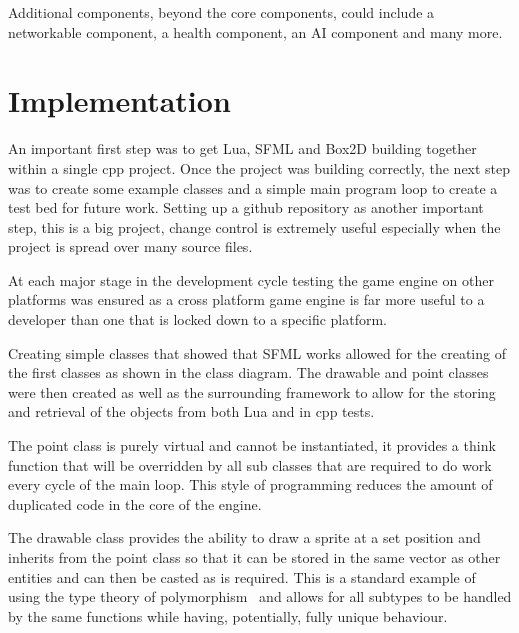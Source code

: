 \documentclass[11pt,a4paper,titlepage]{report}
\begin{document}
	Additional components, beyond the core components, could include a networkable component, a health component, an AI component and many more.










\chapter{Implementation}


    
    An important first step was to get Lua, SFML and Box2D building together within a single cpp project. Once the project was building correctly, the next step was to create some example classes and a simple main program loop to create a test bed for future work. Setting up a github repository as another important step, this is a big project, change control is extremely useful especially when the project is spread over many source files.

    At each major stage in the development cycle testing the game engine on other platforms was ensured as a cross platform game engine is far more useful to a developer than one that is locked down to a specific platform.

    
    Creating simple classes that showed that SFML works allowed for the creating of the first classes as shown in the class diagram. The drawable and point classes were then created as well as the surrounding framework to allow for the storing and retrieval of the objects from both Lua and in cpp tests.

    The point class is purely virtual and cannot be instantiated, it provides a think function that will be overridden by all sub classes that are required to do work every cycle of the main loop. This style of programming reduces the amount of duplicated code in the core of the engine.

    The drawable class provides the ability to draw a sprite at a set position and inherits from the point class so that it can be stored in the same vector as other entities and can then be casted as is required. This is a standard example of using the type theory of polymorphism~\cite{PolymorphismDef} and allows for all subtypes to be handled by the same functions while having, potentially, fully unique behaviour.
	
\end{document}
